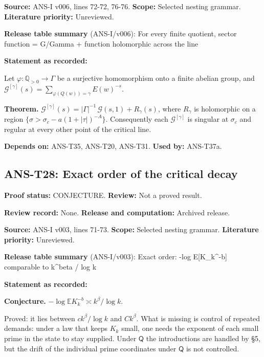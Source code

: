 \documentclass[
  11pt,
]{article}
\begin{document}
\textbf{Source:} ANS-I v006, lines 72-72, 76-76. \textbf{Scope:}
Selected nesting grammar. \textbf{Literature priority:} Unreviewed.

\textbf{Release table summary} (ANS-I/v006): For every finite quotient,
sector function = G/\textbar Gamma\textbar{} + function holomorphic
across the line

\textbf{Statement as recorded:}

Let \(\varphi:\mathbb Q_{>0}\to\Gamma\) be a surjective homomorphism
onto a finite abelian group, and
\(\mathcal G^{[\gamma]}(s)=\sum_{\varphi(Q(w))=\gamma}E(w)^{-s}\).

\textbf{Theorem.}
\(\mathcal G^{[\gamma]}(s)=|\Gamma|^{-1}\,\mathcal G(s,1)+R_\gamma(s)\),
where \(R_\gamma\) is holomorphic on a region
\(\{\sigma>\sigma_c-a(1+|\tau|)^{-A}\}\). Consequently each
\(\mathcal G^{[\gamma]}\) is singular at \(\sigma_c\) and regular at
every other point of the critical line.

\textbf{Depends on:} ANS-T35, ANS-T20, ANS-T31. \textbf{Used by:}
ANS-T37a.

\hypertarget{ans-t28-exact-order-of-the-critical-decay}{%
\subsection{ANS-T28: Exact order of the critical
decay}\label{ans-t28-exact-order-of-the-critical-decay}}

\textbf{Proof status:} CONJECTURE. \textbf{Review:} Not a proved result.

\textbf{Review record:} None. \textbf{Release and computation:} Archived
release.

\textbf{Source:} ANS-I v003, lines 71-73. \textbf{Scope:} Selected
nesting grammar. \textbf{Literature priority:} Unreviewed.

\textbf{Release table summary} (ANS-I/v003): Exact order: -log
E{[}K\_k\^{}-b{]} comparable to k\^{}beta / log k

\textbf{Statement as recorded:}

\textbf{Conjecture.} \(-\log\mathbb E K_k^{-b}\asymp k^{\beta}/\log k\).

Proved: it lies between \(ck^{\beta}/\log k\) and \(Ck^{\beta}\). What
is missing is control of repeated demands: under a law that keeps
\(K_k\) small, one needs the exponent of each small prime in the state
to stay supplied. Under \(\mathsf Q\) the introductions are handled by
§5, but the drift of the individual prime coordinates under
\(\mathsf Q\) is not controlled.
\end{document}

